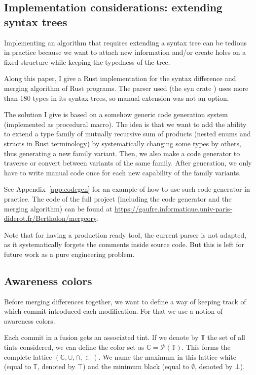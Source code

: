 \documentclass[a4paper,11pt]{article}
\begin{document}
\subsection{Implementation considerations: extending syntax trees}
\label{sec:codegen}
Implementing an algorithm that requires extending a syntax tree can be tedious in practice because we want to attach new information and/or create holes on a fixed structure while keeping the typedness of the tree.

Along this paper, I give a Rust implementation for the syntax difference and merging algorithm of Rust programs. The parser used (the syn crate \cite{syn-crate}) uses more than 180 types in its syntax trees, so manual extension was not an option.

The solution I give is based on a somehow generic code generation system (implemented as procedural macro). The idea is that we want to add the ability to extend a type family of mutually recursive sum of products (nested enums and structs in Rust terminology) by systematically changing some types by others, thus generating a new family variant. Then, we also make a code generator to traverse or convert between variants of the same family. After generation, we only have to write manual code once for each new capability of the family variants.

See Appendix~\ref{app:codegen} for an example of how to use such code generator in practice. The code of the full project (including the code generator and the merging algorithm) can be found at \url{https://gaufre.informatique.univ-paris-diderot.fr/Bertholon/mergeory}.

Note that for having a production ready tool, the current parser is
not adapted, as it systematically forgets the comments inside source
code. But this is left for future work as a pure engineering problem.

\subsection{Awareness colors}
\label{sec:colors}
Before merging differences together, we want to define a way of keeping track of which commit introduced each modification. For that we use a notion of awareness colors.

Each commit in a fusion gets an associated tint. If we denote by
$\mathbb{T}$ the set of all tints considered, we can define the color
set as $\mathbb{C} = \mathcal{P}(\mathbb{T})$. This forms the complete
lattice $(\mathbb{C}, \cup, \cap, \subset)$. We name the maximum in
this lattice white (equal to $\mathbb{T}$, denoted by $\top$) and the
minimum black (equal to $\emptyset$, denoted by $\bot$).
\end{document}
